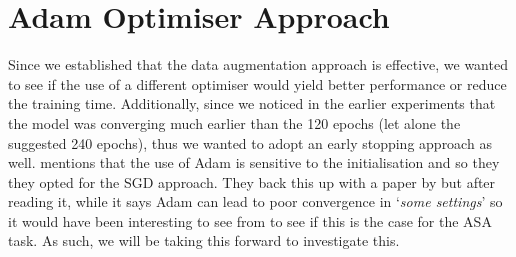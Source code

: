 \documentclass[logo,bsc,singlespacing,parskip,online]{infthesis}
\begin{document}
\section{Adam Optimiser Approach}
Since we established that the data augmentation approach is effective, we wanted to see 
if the use of a different optimiser would yield better performance or reduce the 
training time. Additionally, since we noticed in the earlier experiments 
that the model was converging much earlier than the 120 epochs (let alone the suggested 
240 epochs), thus we wanted to adopt an early stopping approach as well.
\citet{Huwel2020HearDS} mentions that the use of Adam is sensitive to the initialisation 
and so they they opted for the SGD approach. 
They back this up with a paper by \citet{} 
but after reading it, while it says 
Adam can lead to poor convergence in `\textit{some settings}'
so it would have been interesting to see from \citet{Huwel2020HearDS}
to see if this is the case for the ASA task. As such, 
we will be taking this forward to investigate this.
\end{document}
